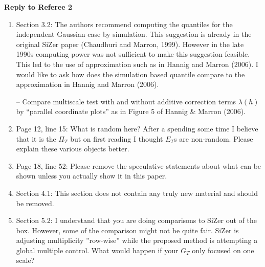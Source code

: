 \documentclass[a4paper,12pt]{article}
\begin{document}
\newpage
\begin{center}
{\large \bf Reply to Referee 2} 
\end{center}


\begin{enumerate}
\item Section 3.2: The authors recommend computing the quantiles for the independent Gaussian case by simulation. This suggestion is already in the original SiZer paper (Chaudhuri and Marron, 1999). However in the late 1990s computing power was not sufficient to make this suggestion feasible. This led to the use of approximation such as in Hannig and Marron (2006). I would like to ask how does the simulation based quantile compare to the approximation in Hannig and Marron (2006). 

-- Compare multiscale test with and without additive correction terms $\lambda(h)$ by ``parallel coordinate plots'' as in Figure 5 of Hannig \& Marron (2006). 

\item Page 12, line 15: What is random here? After a spending some time I believe that it is the $\Pi_T$ but on first reading I thought $E_T$s are non-random. Please explain these various objects better.
\item Page 18, line 52: Please remove the speculative statements about what can be shown unless you actually show it in this paper.

\item Section 4.1: This section does not contain any truly new material and should be removed.

\item Section 5.2: I understand that you are doing comparisons to SiZer out of the box. However, some of the comparison might not be quite fair. SiZer is adjusting multiplicity ”row-wise” while the proposed method is attempting a global multiple control. What would happen if your $G_T$ only focused on one scale?


\end{enumerate}
\end{document}
